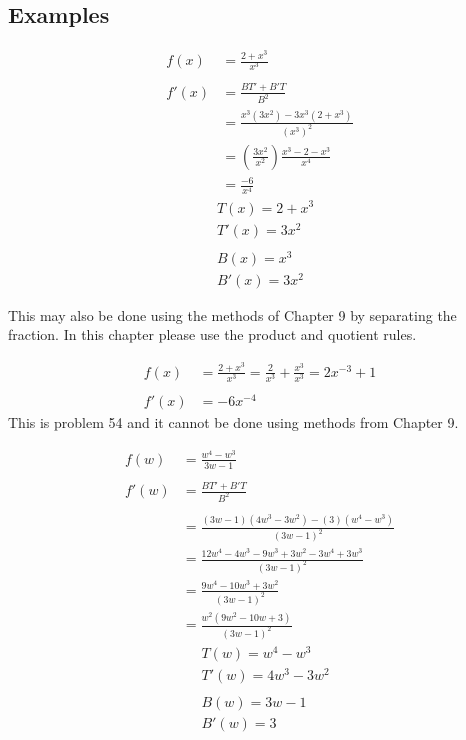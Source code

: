 \documentclass[14pt]{extarticle}
\begin{document}
\subsection*{Examples}
\begin{multicols}{2}
	\begin{align*}
		f(x) &= \frac{2+x^3}{x^3} \\\\
		f'(x) &= \frac{BT' + B'T}{B^2} \\
		&= \frac{x^3(3x^2)-3x^3(2+x^3)}{(x^3)^2} \\
		&= \left(\frac{3x^2}{x^2}\right) \frac{x^3-2-x^3}{x^4} \\
		&= \frac{-6}{x^4}
	\end{align*}
	\vfill\null
	\columnbreak
	\begin{align*}
		&T(x) = 2+x^3 \\
		&T'(x) = 3x^2 \\\\
		&B(x)= x^3 \\
		&B'(x) = 3x^2
	\end{align*}
	\vfill\null
\end{multicols}
This may also be done using the methods of Chapter 9 by separating the fraction. In this chapter please use the product and quotient rules.

\begin{align*}
	f(x) &= \frac{2+x^3}{x^3} = \frac{2}{x^3}+ \frac{x^3}{x^3} = 2x^{-3} +1 \\\\
	f'(x) &= -6x^{-4}
\end{align*}
This is problem 54 and it cannot be done using methods from Chapter 9.
\begin{multicols}{2}
	\begin{align*}
		f(w) &= \frac{w^4 - w^3}{3w-1} \\\\
		f'(w) &= \frac{BT' + B'T}{B^2} \\ \\
		&= \frac{(3w-1)(4w^3 - 3w^2) - (3)(w^4 - w^3)}{(3w-1)^2} \\
		&= \frac{12w^4- 4w^3 - 9w^3 + 3w^2 - 3w^4 + 3w^3}{(3w-1)^2} \\
		&=\frac{9w^4- 10w^3 + 3w^2 }{(3w-1)^2} \\
		&=\frac{w^2(9w^2- 10w + 3) }{(3w-1)^2}
	\end{align*}
	\vfill\null
	\columnbreak
	\begin{align*}
		&T(w) = w^4 - w^3 \\
		&T'(w) = 4w^3-3w^2 \\\\
		&B(w)= 3w-1 \\
		&B'(w) = 3
	\end{align*}
	\vfill\null
\end{multicols}
\end{document}
